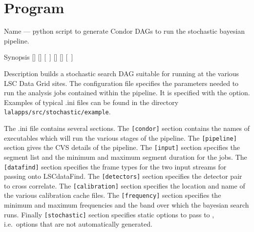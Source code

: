 
\section{Program }
\label{program:lalapps-stochastic-bayes}

\begin{entry}
\item[Name]
 --- python script to generate Condor DAGs
to run the stochastic bayesian pipeline.

\item[Synopsis]
 \newline \hspace*{0.5in}
[] \newline \hspace*{0.5in}
[] \newline \hspace*{0.5in}
[~] \newline \hspace*{0.5in}
[] \newline \hspace*{0.5in}
[] \newline \hspace*{0.5in}
[~] \newline \hspace*{0.5in}
~ \newline \hspace*{0.5in}
~

\item[Description]
 builds a stochastic search DAG suitable
for running at the various LSC Data Grid sites. The configuration file
specifies the parameters needed to run the analysis jobs contained
within the pipeline. It is specified with the 
option. Examples of typical .ini files can be found in the directory
\texttt{lalapps/src/stochastic/example}.

The .ini file contains several sections. The \verb$[condor]$ section
contains the names of executables which will run the various stages of
the pipeline. The \verb$[pipeline]$ section gives the CVS details of the
pipeline. The \verb$[input]$ section specifies the segment list and the
minimum and maximum segment duration for the jobs. The \verb$[datafind]$
section specifies the frame types for the two input streams for passing
onto LSCdataFind. The \verb$[detectors]$ section specifies the detector
pair to cross correlate. The \verb$[calibration]$ section specifies the
location and name of the various calibration cache files. The
\verb$[frequency]$ section specifies the minimum and maximum frequencies
and the band over which the bayesian search runs. Finally
\verb$[stochastic]$ section specifies static options to pass to
, i.e.~options that are not automatically
generated.


\end{entry}
